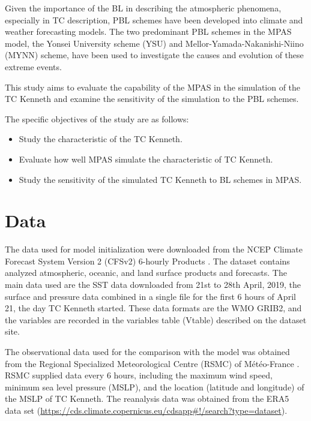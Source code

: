 \documentclass[8pt,a4paper]{article}
\begin{document}
	Given the importance of the BL in describing the atmospheric phenomena, especially in TC description, PBL schemes have been developed into climate and weather forecasting models. The two predominant PBL schemes in the MPAS model, the Yonsei University scheme (YSU) and Mellor-Yamada-Nakanishi-Niino (MYNN) scheme, have been used to investigate the causes and evolution of these extreme events.
	
	This study aims to evaluate the capability of the MPAS in the simulation of the TC Kenneth and examine the sensitivity of the simulation to the PBL schemes.
	
	The specific objectives of the study are as follows:
	
	\begin{itemize}
		
		\item Study the characteristic of the TC Kenneth.
		\item Evaluate how well MPAS simulate the characteristic of TC Kenneth.
		\item Study the sensitivity of the simulated TC Kenneth to BL schemes in MPAS.
	\end{itemize}
	
	
	
	\section{Data }
	
	The data used for model initialization were downloaded from the NCEP Climate Forecast System Version 2 (CFSv2) 6-hourly Products \citep{cisl_rda_ds094.0}. The dataset contains analyzed atmospheric, oceanic, and land surface products and forecasts. The main data used are the SST data downloaded from 21st to 28th April, 2019, the surface and pressure data combined in a single file for the first 6 hours of April 21, the day TC Kenneth started.  These data formats are the WMO GRIB2, and the variables are recorded in the variables table (Vtable) described on the dataset site.
	
	The observational data used for the comparison with the model was obtained from the Regional Specialized Meteorological Centre (RSMC) of Météo-France \citep{meteofr2019data}. RSMC supplied data every 6 hours, including the maximum wind speed, minimum sea level pressure (MSLP), and the location (latitude and longitude) of the MSLP of TC Kenneth. The reanalysis data was obtained from the ERA5 data set (\url{https://cds.climate.copernicus.eu/cdsapp#!/search?type=dataset}).
	
\end{document}
